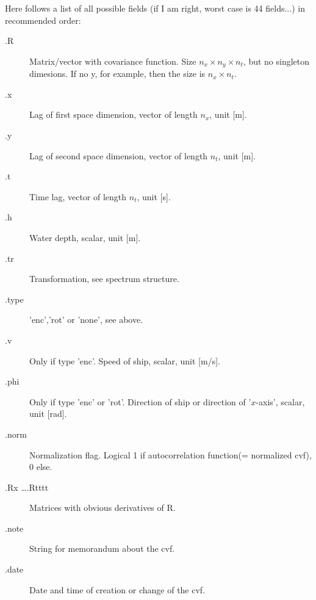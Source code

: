 \documentclass{article}
\begin{document}
Here follows a list of all possible fields (if I am right, worst case
is 44 fields...) in recommended order:
\begin{description}
\item[.R] Matrix/vector with covariance function. Size $n_x \times
  n_y\times  n_t$, but no singleton dimesions. If no y, for example,
  then the size is $n_x \times n_t$.
\item[.x] Lag of first space dimension, vector of length $n_x$, unit
  [m].
\item[.y] Lag of second space dimension, vector of length $n_t$, unit
  [m].
\item[.t] Time lag, vector of length $n_t$, unit [s].
\item[.h] Water depth, scalar, unit [m].
\item[.tr] Transformation, see spectrum structure.
\item[.type] 'enc','rot' or 'none', see above.
\item[.v] Only if type 'enc'. Speed of ship, scalar, unit [m/s].
\item[.phi] Only if type 'enc' or 'rot'. Direction of ship 
  or direction of '$x$-axis', scalar, unit [rad].
\item[.norm] Normalization flag. Logical 1 if autocorrelation function(=
  normalized cvf), 0 else.
\item[.Rx \ldots .Rtttt] Matrices with obvious derivatives of R.  
\item[.note] String for memorandum about the cvf.
\item[.date] Date and time of creation or change of the cvf.
\end{description}

\end{document}
